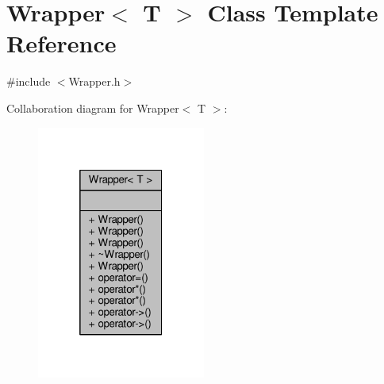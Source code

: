 \hypertarget{classWrapper}{}\section{Wrapper$<$ T $>$ Class Template Reference}
\label{classWrapper}


{\ttfamily \#include $<$Wrapper.\+h$>$}



Collaboration diagram for Wrapper$<$ T $>$\+:
\nopagebreak
\begin{figure}[H]
\begin{center}
\leavevmode
\includegraphics[width=157pt]{classWrapper__coll__graph}
\end{center}
\end{figure}
